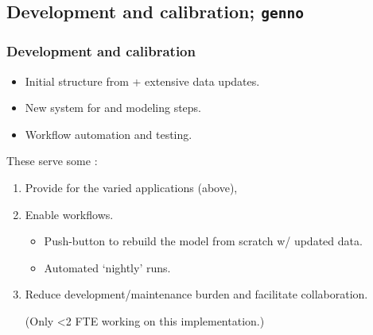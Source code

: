 \documentclass[12pt,aspectratio=169]{beamer}
\begin{document}
\subsection{Development and calibration; \texttt{genno}}
\begin{frame}
\frametitle{Development and calibration}

\begin{itemize}
  \item Initial structure from \textcite{mccollum-2017} + extensive data updates.
  \item New system for  and  modeling steps.
  \item Workflow automation and testing.
\end{itemize}

\medskip
These serve some :
\begin{enumerate}
  \item Provide  for the varied applications (above),
  \item Enable  workflows.
  \begin{itemize}
    \item Push-button to rebuild the model from scratch w/ updated data.
    \item Automated ‘nightly’ runs.
  \end{itemize}
  \item Reduce development/maintenance burden and facilitate collaboration.

  (Only <2 FTE working on this implementation.)
\end{enumerate}
\end{frame}
\end{document}
